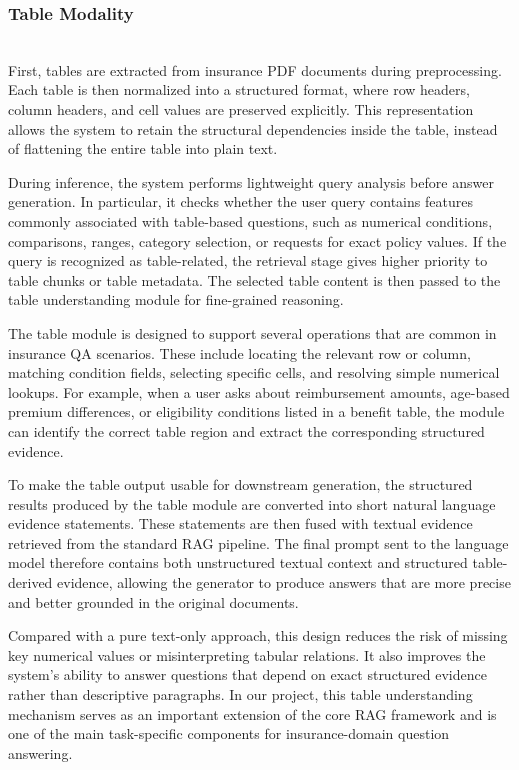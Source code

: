 \documentclass[10pt,conference]{IEEEtran}
\begin{document}
\subsubsection{Table Modality}
\leavevmode\\
First, tables are extracted from insurance PDF documents during preprocessing. Each table is then normalized into a structured format, where row headers, column headers, and cell values are preserved explicitly. This representation allows the system to retain the structural dependencies inside the table, instead of flattening the entire table into plain text.

During inference, the system performs lightweight query analysis before answer generation. In particular, it checks whether the user query contains features commonly associated with table-based questions, such as numerical conditions, comparisons, ranges, category selection, or requests for exact policy values. If the query is recognized as table-related, the retrieval stage gives higher priority to table chunks or table metadata. The selected table content is then passed to the table understanding module for fine-grained reasoning.

The table module is designed to support several operations that are common in insurance QA scenarios. These include locating the relevant row or column, matching condition fields, selecting specific cells, and resolving simple numerical lookups. For example, when a user asks about reimbursement amounts, age-based premium differences, or eligibility conditions listed in a benefit table, the module can identify the correct table region and extract the corresponding structured evidence.

To make the table output usable for downstream generation, the structured results produced by the table module are converted into short natural language evidence statements. These statements are then fused with textual evidence retrieved from the standard RAG pipeline. The final prompt sent to the language model therefore contains both unstructured textual context and structured table-derived evidence, allowing the generator to produce answers that are more precise and better grounded in the original documents.

Compared with a pure text-only approach, this design reduces the risk of missing key numerical values or misinterpreting tabular relations. It also improves the system's ability to answer questions that depend on exact structured evidence rather than descriptive paragraphs. In our project, this table understanding mechanism serves as an important extension of the core RAG framework and is one of the main task-specific components for insurance-domain question answering.
\end{document}
